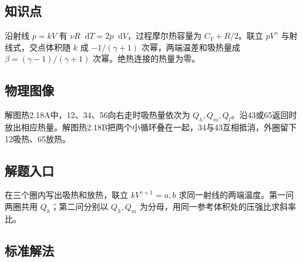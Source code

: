 \documentclass[UTF8,fontset=fandol,a4paper,11pt]{ctexart}
\newcommand{\dd}{\mathop{}\!\mathrm{d}}
\begin{document}
\subsection*{知识点}

沿射线 $p=kV$ 有 $\nu R\dd T=2p\dd V$，过程摩尔热容量为 $C_V+R/2$。联立 $pV^\gamma$ 与射线式，交点体积随 $k$ 成 $-1/(\gamma+1)$ 次幂，两端温差和吸热量成 $\beta=(\gamma-1)/(\gamma+1)$ 次幂。绝热连接的热量为零。




\subsection*{物理图像}

解图热2.18A中，12、34、56向右走时吸热量依次为 $Q_h,Q_m,Q_l$。沿43或65返回时放出相应热量。解图热2.18B把两个小循环叠在一起，34与43互相抵消，外圈留下12吸热、65放热。



\subsection*{解题入口}

在三个圈内写出吸热和放热，联立 $kV^{\gamma+1}=a,b$ 求同一射线的两端温度。第一问两圈共用 $Q_h$；第二问分别以 $Q_h,Q_m$ 为分母，用同一参考体积处的压强比求斜率比。




\subsection*{标准解法}
\end{document}
